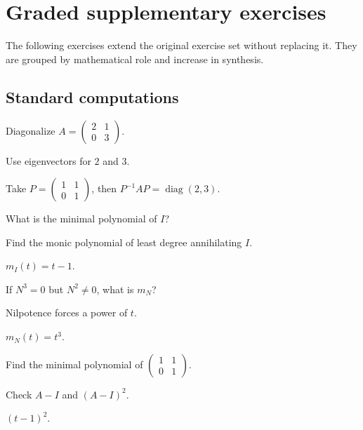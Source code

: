\section{Graded supplementary exercises}
The following exercises extend the original exercise set without replacing it. They are grouped by mathematical role and increase in synthesis.

\subsection*{Standard computations}

\begin{exercise}[Diagonalize 2x2]\label{exr:i11-expand-01}
Diagonalize \(A=\begin{pmatrix}2&1\\0&3\end{pmatrix}\).
\end{exercise}
\begin{hint}
Use eigenvectors for \(2\) and \(3\).
\end{hint}
\begin{solution}
Take \(P=\begin{pmatrix}1&1\\0&1\end{pmatrix}\), then \(P^{-1}AP=\operatorname{diag}(2,3)\).
\end{solution}

\begin{exercise}\label{exr:i11-expand-02}
What is the minimal polynomial of \(I\)?
\end{exercise}
\begin{hint}
Find the monic polynomial of least degree annihilating \(I\).
\end{hint}
\begin{solution}
\(m_I(t)=t-1\).
\end{solution}

\begin{exercise}\label{exr:i11-expand-03}
If \(N^3=0\) but \(N^2\neq0\), what is \(m_N\)?
\end{exercise}
\begin{hint}
Nilpotence forces a power of \(t\).
\end{hint}
\begin{solution}
\(m_N(t)=t^3\).
\end{solution}

\begin{exercise}\label{exr:i11-expand-04}
Find the minimal polynomial of \(\begin{pmatrix}1&1\\0&1\end{pmatrix}\).
\end{exercise}
\begin{hint}
Check \(A-I\) and \((A-I)^2\).
\end{hint}
\begin{solution}
\((t-1)^2\).
\end{solution}

